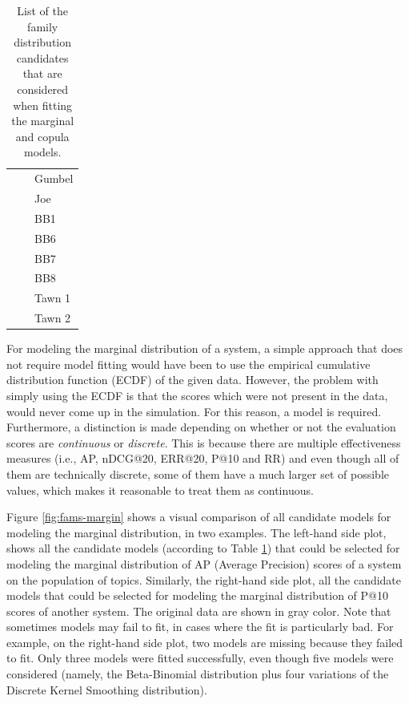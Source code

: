 \begin{table}[t]
\begin{tabular}{l r @{}l }
			& & Gumbel \\
			& & Joe \\
			& & BB1 \\
			& & BB6 \\
			& & BB7 \\
			& & BB8 \\
			& & Tawn 1 \\
			& & Tawn 2 \\
			\bottomrule
		\end{tabular}
		\caption{List of the family distribution candidates that are considered when fitting the marginal and copula models.}
		\label{tab:fams}
\end{table}

For modeling the marginal distribution of a system, a simple approach that does not require model fitting would have been to use the empirical cumulative distribution function (ECDF) of the given data. However, the problem with simply using the ECDF is that the scores which were not present in the data, would never come up in the simulation. For this reason, a model is required. Furthermore, a distinction is made depending on whether or not the evaluation scores are \textit{continuous} or \textit{discrete}. This is because there are multiple effectiveness measures (i.e., AP, nDCG@20, ERR@20, P@10 and RR) and even though all of them are technically discrete, some of them have a much larger set of possible values, which makes it reasonable to treat them as continuous. 

Figure \ref{fig:fams-margin} shows a visual comparison of all candidate models for modeling the marginal distribution, in two examples. The left-hand side plot, shows all the candidate models (according to Table \ref{tab:fams}) that could be selected for modeling the marginal distribution of AP (Average Precision) scores of a system on the population of topics. Similarly, the right-hand side plot, all the candidate models that could be selected for modeling the marginal distribution of P@10 scores of another system. The original data are shown in gray color. Note that sometimes models may fail to fit, in cases where the fit is particularly bad. For example, on the right-hand side plot, two models are missing because they failed to fit. Only three models were fitted successfully, even though five models were considered (namely, the Beta-Binomial distribution plus four variations of the Discrete Kernel Smoothing distribution).

